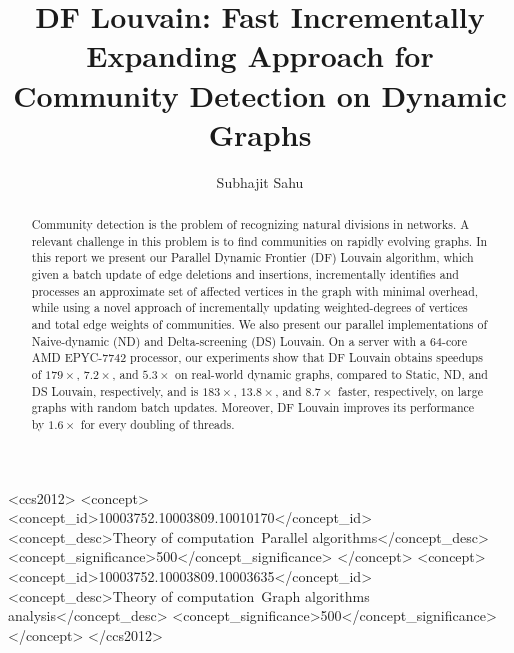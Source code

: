 \documentclass[sigconf,nonacm]{acmart}
\begin{document}
\title{DF Louvain: Fast Incrementally Expanding Approach for Community Detection on Dynamic Graphs}


\author{Subhajit Sahu}



\begin{abstract}
Community detection is the problem of recognizing natural divisions in networks. A relevant challenge in this problem is to find communities on rapidly evolving graphs. In this report we present our Parallel Dynamic Frontier (DF) Louvain algorithm, which given a batch update of edge deletions and insertions, incrementally identifies and processes an approximate set of affected vertices in the graph with minimal overhead, while using a novel approach of incrementally updating weighted-degrees of vertices and total edge weights of communities. We also present our parallel implementations of Naive-dynamic (ND) and Delta-screening (DS) Louvain. On a server with a 64-core AMD EPYC-7742 processor, our experiments show that DF Louvain obtains speedups of $179\times$, $7.2\times$, and $5.3\times$ on real-world dynamic graphs, compared to Static, ND, and DS Louvain, respectively, and is $183\times$, $13.8\times$, and $8.7\times$ faster, respectively, on large graphs with random batch updates. Moreover, DF Louvain improves its performance by $1.6\times$ for every doubling of threads.
\end{abstract}

\begin{CCSXML}
<ccs2012>
<concept>
<concept_id>10003752.10003809.10010170</concept_id>
<concept_desc>Theory of computation~Parallel algorithms</concept_desc>
<concept_significance>500</concept_significance>
</concept>
<concept>
<concept_id>10003752.10003809.10003635</concept_id>
<concept_desc>Theory of computation~Graph algorithms analysis</concept_desc>
<concept_significance>500</concept_significance>
</concept>
</ccs2012>
\end{CCSXML}
\end{document}
